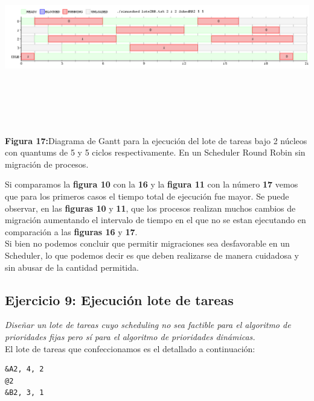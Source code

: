 \documentclass[a4paper]{article}
\begin{document}
\includegraphics[width=\textwidth,height=3.0in,keepaspectratio
]{imagenes/ej8/2eje6.png} \\
\begin {flushleft}
\textbf{Figura 17:}Diagrama de Gantt para la ejecuci\'on del lote de tareas bajo 2 n\'ucleos con quantums de 5 y 5 ciclos respectivamente. En un Scheduler Round Robin sin migración de procesos.
\end{flushleft}	
 
 \bigskip
 Si comparamos la\textbf{ figura 10} con la \textbf{16} y la\textbf{ figura 11} con la número \textbf{17} vemos que para los primeros casos el tiempo total de ejecución fue mayor. Se puede observar, en las \textbf{figuras 10} y \textbf{11}, que los procesos realizan muchos cambios de migración aumentando el intervalo de tiempo en el que no se estan ejecutando en comparación a las \textbf{figuras 16} y \textbf{17}. \\
 
 Si bien no podemos concluir que permitir migraciones sea desfavorable en un Scheduler, lo que podemos decir es que deben realizarse de manera cuidadosa y sin abusar de la cantidad permitida. 
 
\newpage
 \subsection{Ejercicio 9:  Ejecuci\'on lote de tareas}
\textit{Dise\~nar un lote de tareas cuyo scheduling no sea factible para el algoritmo de prioridades fijas pero s\'i para el algoritmo de prioridades din\'amicas.}\\

El lote de tareas que confeccionamos es el detallado a continuaci\'on:

	\begin{codesnippet}
	\begin{verbatim}
&A2, 4, 2
@2
&B2, 3, 1
	\end{verbatim}
	\end{codesnippet}
\end{document}
